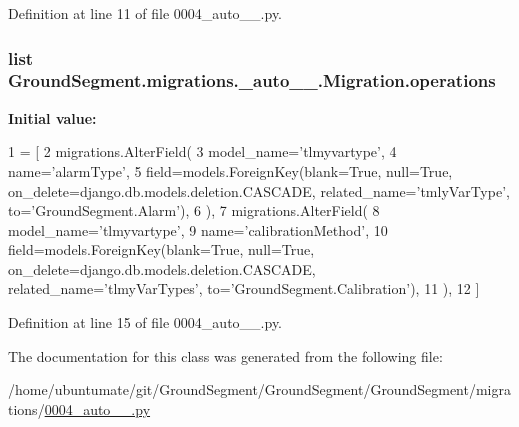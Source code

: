 Definition at line 11 of file 0004\+\_\+auto\+\_\+\_.\+py.

\hypertarget{class_ground_segment_1_1migrations_1_10004__auto__20161126__1516_1_1_migration_abcf442a4a45a6a0280b9aa68dadde471}{}
\subsubsection[{operations}]{\setlength{\rightskip}{0pt plus 5cm}list Ground\+Segment.\+migrations.\+\_\+auto\+\_\+\_.\+Migration.\+operations\hspace{0.3cm}{\ttfamily [static]}}\label{class_ground_segment_1_1migrations_1_10004__auto__20161126__1516_1_1_migration_abcf442a4a45a6a0280b9aa68dadde471}
{\bfseries Initial value\+:}
\begin{DoxyCode}
1 = [
2         migrations.AlterField(
3             model\_name=\textcolor{stringliteral}{'tlmyvartype'},
4             name=\textcolor{stringliteral}{'alarmType'},
5             field=models.ForeignKey(blank=\textcolor{keyword}{True}, null=\textcolor{keyword}{True}, on\_delete=django.db.models.deletion.CASCADE, 
      related\_name=\textcolor{stringliteral}{'tmlyVarType'}, to=\textcolor{stringliteral}{'GroundSegment.Alarm'}),
6         ),
7         migrations.AlterField(
8             model\_name=\textcolor{stringliteral}{'tlmyvartype'},
9             name=\textcolor{stringliteral}{'calibrationMethod'},
10             field=models.ForeignKey(blank=\textcolor{keyword}{True}, null=\textcolor{keyword}{True}, on\_delete=django.db.models.deletion.CASCADE, 
      related\_name=\textcolor{stringliteral}{'tlmyVarTypes'}, to=\textcolor{stringliteral}{'GroundSegment.Calibration'}),
11         ),
12     ]
\end{DoxyCode}


Definition at line 15 of file 0004\+\_\+auto\+\_\+\_.\+py.



The documentation for this class was generated from the following file\+:\begin{DoxyCompactItemize}
\item 
/home/ubuntumate/git/\+Ground\+Segment/\+Ground\+Segment/\+Ground\+Segment/migrations/\hyperlink{0004__auto__20161126__1516_8py}{0004\+\_\+auto\+\_\+\_.\+py}\end{DoxyCompactItemize}
